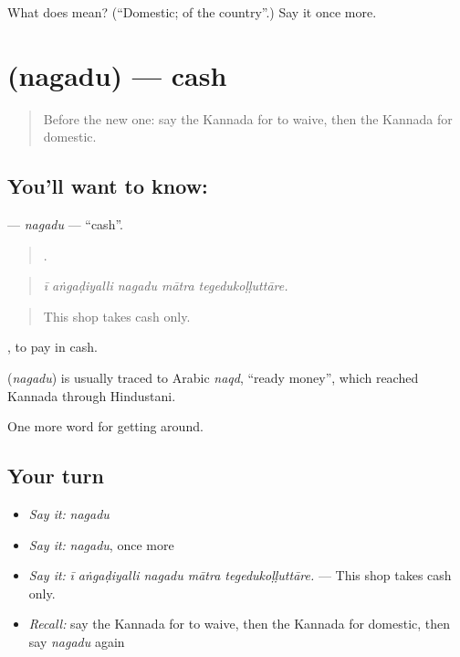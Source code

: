 \begin{tcolorbox}[breakable,colback=teal!4,colframe=teal!35!black,title={Before you move on}]
What does  mean? (\textquotedblleft{}Domestic; of the country\textquotedblright{}.) Say it once more.
\end{tcolorbox}
\section[\texorpdfstring{\kn{ನಗದು} (nagadu)}{ನಗದು (nagadu)}]{ (nagadu) — cash}

\label{lesson:KA-C441-nagadu}



\begin{quote}
Before the new one: say the Kannada for to waive, then the Kannada for domestic.
\end{quote}

\subsection*{You'll want to know: }
\textbf{} — \emph{nagadu} — \textquotedblleft{}cash\textquotedblright{}.

\begin{quote}
    .
\end{quote}

\begin{quote}
\emph{ī aṅgaḍiyalli nagadu mātra tegedukoḷḷuttāre.}
\end{quote}

\begin{quote}
This shop takes cash only.
\end{quote}

 , to pay in cash.

\begin{cousinweb}
\textbf{} (\emph{nagadu}) is usually traced to Arabic \emph{naqd}, \textquotedblleft{}ready money\textquotedblright{}, which reached Kannada through Hindustani.
\end{cousinweb}

\begin{grammarlens}[title={What you've built}]
One more word for getting around.
\end{grammarlens}

\subsection*{Your turn}
\begin{itemize}
\raggedright
  \item \emph{Say it:} \emph{nagadu}
  \item \emph{Say it:} \emph{nagadu}, once more
  \item \emph{Say it:} \emph{ī aṅgaḍiyalli nagadu mātra tegedukoḷḷuttāre.} — This shop takes cash only.
  \item \emph{Recall:} say the Kannada for to waive, then the Kannada for domestic, then say \emph{nagadu} again
\end{itemize}


